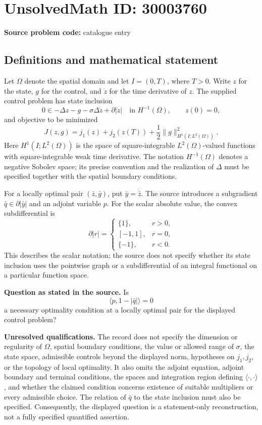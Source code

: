 \documentclass[11pt]{article}
\begin{document}
\section*{UnsolvedMath ID: 30003760}
\textbf{Source problem code:} catalogue entry
\subsection{Definitions and mathematical statement}
Let \(\Omega\) denote the spatial domain and let \(I=(0,T)\), where \(T>0\). Write \(z\) for the state, \(g\) for the control, and \(\dot z\) for the time derivative of \(z\). The supplied control problem has state inclusion
\[
0\in-\Delta z-g-\sigma\Delta\dot z+\partial|\dot z|
\quad\text{in }H^{-1}(\Omega),
\qquad z(0)=0,
\]
and objective to be minimized
\[
J(z,g)=j_1(z)+j_2(z(T))+
\frac12\|g\|_{H^1(I;L^2(\Omega))}^{2}.
\]
Here \(H^1(I;L^2(\Omega))\) is the space of square-integrable \(L^2(\Omega)\)-valued functions with square-integrable weak time derivative. The notation \(H^{-1}(\Omega)\) denotes a negative Sobolev space; its precise convention and the realization of \(\Delta\) must be specified together with the spatial boundary conditions.

For a locally optimal pair \((\bar z,\bar g)\), put \(\bar y=\dot{\bar z}\). The source introduces a subgradient \(\bar q\in\partial|\bar y|\) and an adjoint variable \(p\). For the scalar absolute value, the convex subdifferential is
\[
\partial|r|=
\begin{cases}
\{1\},&r>0,\\
[-1,1],&r=0,\\
\{-1\},&r<0.
\end{cases}
\]
This describes the scalar notation; the source does not specify whether its state inclusion uses the pointwise graph or a subdifferential of an integral functional on a particular function space.

\textbf{Question as stated in the source.} Is
\[
\bigl\langle p,1-|\bar q|\bigr\rangle=0
\]
a necessary optimality condition at a locally optimal pair for the displayed control problem?

\textbf{Unresolved qualifications.} The record does not specify the dimension or regularity of \(\Omega\), spatial boundary conditions, the value or allowed range of \(\sigma\), the state space, admissible controls beyond the displayed norm, hypotheses on \(j_1,j_2\), or the topology of local optimality. It also omits the adjoint equation, adjoint boundary and terminal conditions, the spaces and integration region defining \(\langle\cdot,\cdot\rangle\), and whether the claimed condition concerns existence of suitable multipliers or every admissible choice. The relation of \(\bar q\) to the state inclusion must also be specified. Consequently, the displayed question is a statement-only reconstruction, not a fully specified quantified assertion.
\end{document}
